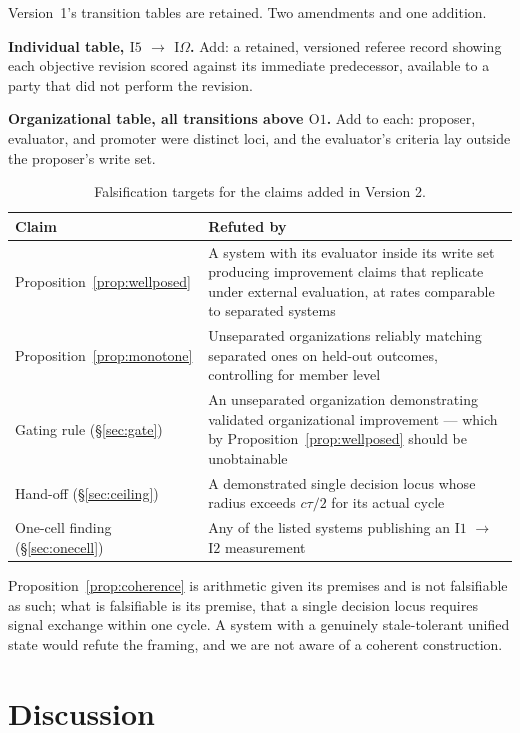 \documentclass[11pt]{article}
\newcommand{\Ilev}[1]{\ensuremath{\mathrm{I}#1}}
\newcommand{\Olev}[1]{\ensuremath{\mathrm{O}#1}}
\newcommand{\IOm}{\ensuremath{\mathrm{I}\Omega}}
\begin{document}
Version~1's transition tables are retained. Two amendments and one addition.

\textbf{Individual table, \Ilev{5} $\to$ \IOm{}.} Add: a retained, versioned referee record showing each objective revision scored against its immediate predecessor, available to a party that did not perform the revision.

\textbf{Organizational table, all transitions above \Olev{1}.} Add to each: proposer, evaluator, and promoter were distinct loci, and the evaluator's criteria lay outside the proposer's write set.

\begin{table}[h]
\centering
\small
\begin{tabularx}{\textwidth}{@{}lX@{}}
\toprule
Claim & Refuted by \\
\midrule
Proposition~\ref{prop:wellposed} & A system with its evaluator inside its write set producing improvement claims that replicate under external evaluation, at rates comparable to separated systems \\
Proposition~\ref{prop:monotone} & Unseparated organizations reliably matching separated ones on held-out outcomes, controlling for member level \\
Gating rule (\S\ref{sec:gate}) & An unseparated organization demonstrating validated organizational improvement --- which by Proposition~\ref{prop:wellposed} should be unobtainable \\
Hand-off (\S\ref{sec:ceiling}) & A demonstrated single decision locus whose radius exceeds $c\tau/2$ for its actual cycle \\
One-cell finding (\S\ref{sec:onecell}) & Any of the listed systems publishing an \Ilev{1} $\to$ \Ilev{2} measurement \\
\bottomrule
\end{tabularx}
\caption{Falsification targets for the claims added in Version 2.}
\end{table}

Proposition~\ref{prop:coherence} is arithmetic given its premises and is not falsifiable as such; what is falsifiable is its premise, that a single decision locus requires signal exchange within one cycle. A system with a genuinely stale-tolerant unified state would refute the framing, and we are not aware of a coherent construction.

\section{Discussion}
\end{document}
